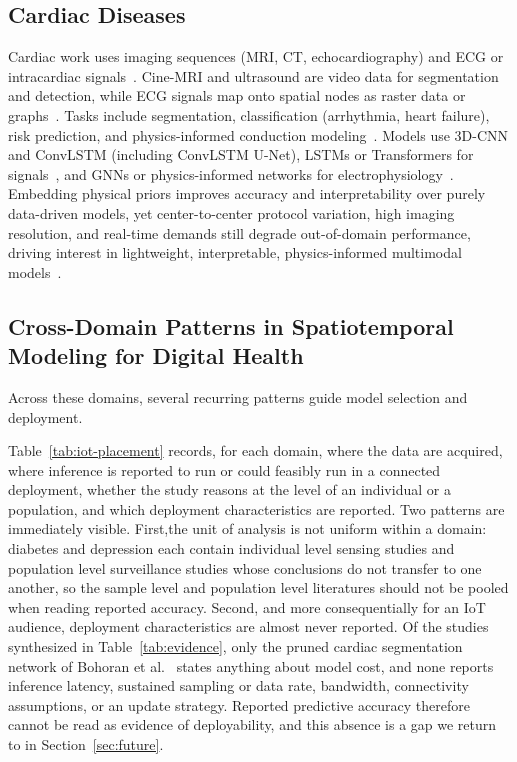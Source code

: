 \documentclass[journal]{IEEEtran}
\newif\ifsubmission
\begin{document}
\subsection{Cardiac Diseases}
Cardiac work uses imaging sequences (MRI, CT, echocardiography) and ECG or intracardiac signals~\cite{5,6,7}. Cine-MRI and ultrasound are video data for segmentation and detection, while ECG signals map onto spatial nodes as raster data or graphs~\cite{7}. Tasks include segmentation, classification (arrhythmia, heart failure), risk prediction, and physics-informed conduction modeling~\cite{7}. Models use 3D-CNN and ConvLSTM (including ConvLSTM U-Net), LSTMs or Transformers for signals~\cite{5,6}, and GNNs or physics-informed networks for electrophysiology~\cite{7}. Embedding physical priors improves accuracy and interpretability over purely data-driven models, yet center-to-center protocol variation, high imaging resolution, and real-time demands still degrade out-of-domain performance, driving interest in lightweight, interpretable, physics-informed multimodal models~\cite{6}.

\subsection{Cross-Domain Patterns in Spatiotemporal Modeling for Digital Health}
Across these domains, several recurring patterns guide model selection and deployment.

\ifsubmission Reading the domains against the connected health lifecycle exposes two patterns. First,\else Table~\ref{tab:iot-placement} records, for each domain, where the data are acquired, where inference is reported to run or could feasibly run in a connected deployment, whether the study reasons at the level of an individual or a population, and which deployment characteristics are reported. Two patterns are immediately visible. First,\fi the unit of analysis is not uniform within a domain: diabetes and depression each contain individual level sensing studies and population level surveillance studies whose conclusions do not transfer to one another, so the sample level and population level literatures should not be pooled when reading reported accuracy. Second, and more consequentially for an IoT audience, deployment characteristics are almost never reported. Of the studies synthesized in Table~\ref{tab:evidence}, only the pruned cardiac segmentation network of Bohoran et al.~\cite{5} states anything about model cost, and none reports inference latency, sustained sampling or data rate, bandwidth, connectivity assumptions, or an update strategy. Reported predictive accuracy therefore cannot be read as evidence of deployability, and this absence is a gap we return to in Section~\ref{sec:future}.
\end{document}
